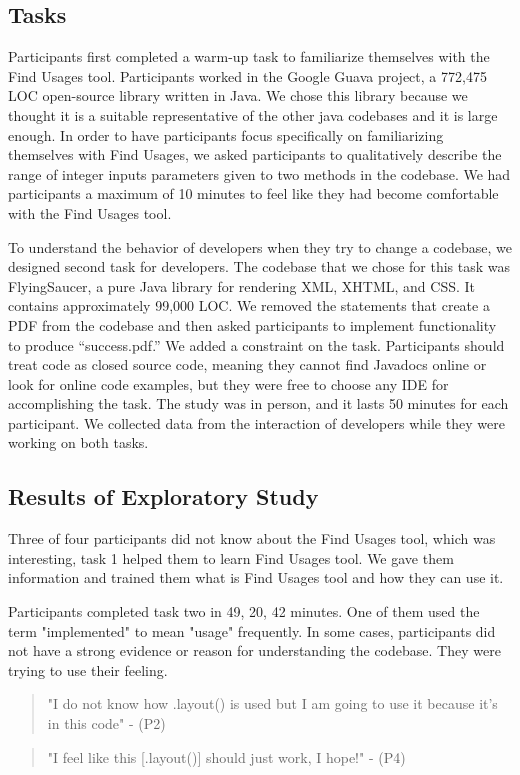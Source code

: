 \documentclass[conference]{IEEEtran}
\begin{document}
\subsection{Tasks}
\label{tasks}

Participants first completed a warm-up task to familiarize themselves with the Find Usages tool. Participants worked in the Google Guava project, a 772,475 LOC open-source library written in Java. We chose this library because we thought it is a suitable representative of the other java codebases and it is large enough. In order to have participants focus specifically on familiarizing themselves with Find Usages, we asked participants to qualitatively describe the range of integer inputs parameters given to two methods in the codebase. We had participants a maximum of 10 minutes to feel like they had become comfortable with the Find Usages tool.\par

To understand the behavior of developers when they try to change a codebase, we designed second task for developers. The codebase that we chose for this task was FlyingSaucer, a pure Java library for rendering XML, XHTML, and CSS. It contains approximately 99,000 LOC. We removed the statements that create a PDF from the codebase and then asked participants to implement functionality to produce “success.pdf.” We added a constraint on the task. Participants should treat code as closed source code, meaning they cannot find Javadocs online or look for online code examples, but they were free to choose any IDE for accomplishing the task. The study was in person, and it lasts 50 minutes for each participant. 
We collected data from the interaction of developers while they were working on both tasks. 

\subsection{Results of Exploratory Study}

Three of four participants did not know about the Find Usages tool, which was interesting, task 1 helped them to learn Find Usages tool. We gave them information and trained them what is Find Usages tool and how they can use it.\par

Participants completed task two in 49, 20, 42 minutes. One of them used the term "implemented" to mean "usage" frequently. In some cases, participants did not have a strong evidence or reason for understanding the codebase. They were trying to use their feeling. 
\begin{quote}"I do not know how .layout() is used but I am going to use it because it's in this code" - (P2) \end{quote}
\begin{quote}"I feel like this [.layout()] should just work, I hope!" - (P4) \end{quote}
\end{document}
